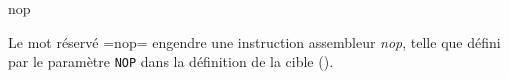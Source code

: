 















\begin{PLM}
nop
\end{PLM}

Le mot réservé \plm=nop= engendre une instruction assembleur \emph{nop}, telle que défini par le paramètre \texttt{NOP} dans la définition de la cible ().

